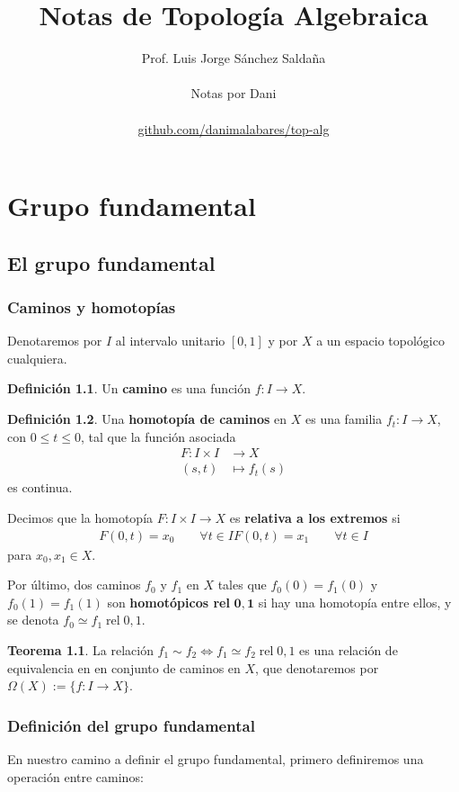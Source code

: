 \documentclass[spanish]{book}
\title{Notas de Topología Algebraica}
\author{Prof. Luis Jorge Sánchez Saldaña\\ \\ Notas por Dani\\ \\ \href{https://github.com/danimalabares/top-alg}{github.com/danimalabares/top-alg}}
\renewcommand{\contentsname}{Índice}
\theoremstyle{definition}
\newtheorem*{defn}{Definición}
\newtheorem*{teo}{Teorema}
\DeclareMathOperator{\rel}{rel}
\begin{document}
	\maketitle
	\addcontentsline{toc}{part}{\contentsname}
	\tableofcontents
	
\part{Grupo fundamental}
\chapter{El grupo fundamental}
\section{Caminos y homotopías}
	Denotaremos por $I$ al intervalo unitario $[0,1]$ y por $X$ a un espacio topológico cualquiera.
	\begin{defn}
		Un \textbf{camino} es una función $f:I\to X$.
	\end{defn}
	\begin{defn}
		Una \textbf{homotopía de caminos} en $X$ es una familia $f_t:I\to X$, con $0\leq t\leq0$, tal que la función asociada
		\begin{align*}
			F:I\times I&\to X\\
			(s,t)&\mapsto f_t(s)
		\end{align*}
		es continua.
		
		Decimos que la homotopía $F:I\times I\to X$ es \textbf{relativa a los extremos} si
		\begin{align*}
			F(0,t)=x_0\qquad\forall t\in I		F(0,t)=x_1\qquad\forall t\in I
		\end{align*}
		para $x_0,x_1\in X$.
		
		Por último, dos caminos $f_0$ y $f_1$ en $X$ tales que $f_0(0)=f_1(0)$ y $f_0(1)=f_1(1)$ son \textbf{homotópicos rel} $\mathbf{0,1}$ si hay una homotopía entre ellos, y se denota $f_0\simeq f_1\rel0,1$.
	\end{defn}
	\begin{teo}
		La relación $f_1\sim{}f_2\iff f_1\simeq f_2\rel0,1$ es una relación de equivalencia en en conjunto de caminos en $X$, que denotaremos por $\Omega(X):=\{f:I\to X\}$.
	\end{teo}
	
\section{Definición del grupo fundamental}
	En nuestro camino a definir el grupo fundamental, primero definiremos una operación entre caminos:
	
\end{document}
